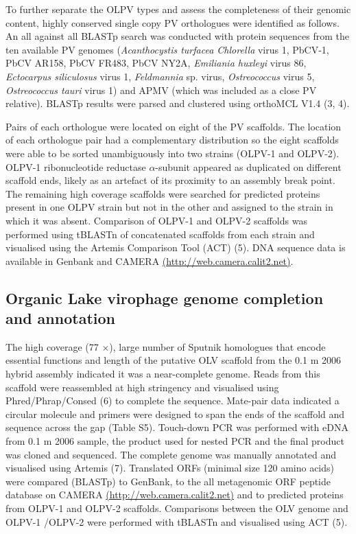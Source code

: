 To further separate the OLPV types and assess the completeness of their genomic content, highly conserved single copy PV orthologues were identified as follows. 
An all against all BLASTp search was conducted with protein sequences from the ten available PV genomes 
(\emph{Acanthocystis turfacea Chlorella} virus 1, PbCV-1, PbCV AR158, PbCV FR483, PbCV NY2A, \emph{Emiliania huxleyi} virus 86, \emph{Ectocarpus siliculosus} virus 1, \emph{Feldmannia} sp. virus, \emph{Ostreococcus} virus 5, \emph{Ostreococcus tauri} virus 1) and APMV (which was included as a close PV relative). 
BLASTp results were parsed and clustered using orthoMCL V1.4 (3, 4). 

Pairs of each orthologue were located on eight of the PV scaffolds. 
The location of each orthologue pair had a complementary distribution so the eight scaffolds were able to be sorted unambiguously into two strains (OLPV-1 and OLPV-2). 
OLPV-1 ribonucleotide reductase $\alpha$-subunit appeared as duplicated on different scaffold ends, likely as an artefact of its proximity to an assembly break point. 
The remaining high coverage scaffolds were searched for predicted proteins present in one OLPV strain but not in the other and assigned to the strain in which it was absent. 
Comparison of OLPV-1 and OLPV-2 scaffolds was performed using tBLASTn of concatenated scaffolds from each strain and visualised using the Artemis Comparison Tool (ACT) (5). 
DNA sequence data is available in Genbank and CAMERA \url{(http://web.camera.calit2.net)}.

\subsection[Genome completion and annotation]{Organic Lake virophage genome completion and annotation}
The high coverage (77 $\times$), large number of Sputnik homologues that encode essential functions and length of the putative OLV scaffold from the 0.1 \textmu{}m 2006 hybrid assembly indicated it was a near-complete genome. 
Reads from this scaffold were reassembled at high stringency and visualised using Phred/Phrap/Consed (6) to complete the sequence. 
Mate-pair data indicated a circular molecule and primers were designed to span the ends of the scaffold and sequence across the gap (Table S5). 
Touch-down PCR was performed with eDNA from 0.1 \textmu{}m 2006 sample, the product used for nested PCR and the final product was cloned and sequenced. 
The complete genome was manually annotated and visualised using Artemis (7). 
Translated ORFs (minimal size 120 amino acids) were compared (BLASTp) to GenBank, to the all metagenomic ORF peptide database on CAMERA \url{(http://web.camera.calit2.net)} and to predicted proteins from OLPV-1 and OLPV-2 scaffolds. 
Comparisons between the OLV genome and OLPV-1 /OLPV-2 were performed with tBLASTn and visualised using ACT (5). 

